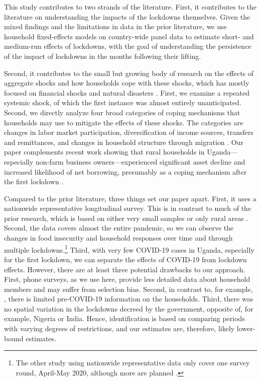 \documentclass{wber}
\begin{document}
This study contributes to two strands of the literature. First, it
contributes to the literature on understanding the impacts of the
lockdowns themselves. Given the mixed findings and the limitations in
data in the prior literature, we use household fixed-effects models on
country-wide panel data to estimate short- and medium-run effects of
lockdowns, with the goal of understanding the persistence of the impact
of lockdowns in the months following their lifting.

Second, it contributes to the small but growing body of research on the
effects of aggregate shocks and how households cope with these shocks,
which has mostly focused on financial shocks and natural disasters
\citep{Del-Ninno2003, Fallon2002, Glewwe1998, Hallegatte2020, McKenzie2003, Skoufias2003, Thomas2007}.
First, we examine a repeated systemic shock, of which the first instance
was almost entirely unanticipated. Second, we directly analyze four
broad categories of coping mechanisms that households may use to
mitigate the effects of these shocks. The categories are changes in
labor market participation, diversification of income sources, transfers
and remittances, and changes in household structure through migration
\citep{Foster2002, Jayachandran2006, Kochar1999, McKenzie2003, Morduch1995, Townsend1994, Yang2007}.
Our paper complements recent work showing that rural households in
Uganda---especially non-farm business owners---experienced significant
asset decline and increased likelihood of net borrowing, presumably as a
coping mechanism after the first lockdown \citep{Mahmud2023}.

Compared to the prior literature, three things set our paper apart.
First, it uses a nationwide representative longitudinal survey. This is
in contrast to much of the prior research, which is based on either very
small samples
\citep{Ruszczyk2021, Squarcina2022, Hirvonen2021, Nguyen2021a} or only
rural areas \citep{Janssens2021, Aggarwal2022}. Second, the data covers
almost the entire pandemic, so we can observe the changes in food
insecurity and household responses over time and through multiple
lockdowns.\footnote{The other study using nationwide representative data
  only cover one survey round, April-May 2020, although more are planned
  \citep{Amare2021}.} Third, with very few COVID-19 cases in Uganda,
especially for the first lockdown, we can separate the effects of
COVID-19 from lockdown effects. However, there are at least three
potential drawbacks to our approach. First, phone surveys, as we use
here, provide less detailed data about household members and may suffer
from selection bias. Second, in contrast to, for example,
\citet{Amare2021}, there is limited pre-COVID-19 information on the
households. Third, there was no spatial variation in the lockdowns
decreed by the government, opposite of, for example, Nigeria or India.
Hence, identification is based on comparing periods with varying degrees
of restrictions, and our estimates are, therefore, likely lower-bound
estimates.
\end{document}
